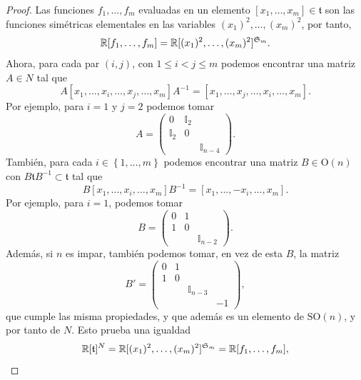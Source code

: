 \documentclass[11pt,a4paper]{amsbook}
\theoremstyle{remark} \newtheorem{rmk}[subsection]{Observación}
\theoremstyle{definition} \newtheorem{defn}[subsection]{Definición}
\theoremstyle{definition} \newtheorem{ex}[subsection]{Ejemplo}
\theoremstyle{definition} \newtheorem{ej}[subsection]{Ejercicio}
\begin{document}
\begin{proof}
Las funciones $f_1,\dots,f_m$ evaluadas en un elemento $[x_1,\dots,x_m]\in \mathfrak{t}$ son las funciones simétricas elementales en las variables $(x_1)^2,\dots,(x_m)^2$, por tanto,
\begin{equation*}
\mathbb R[f_1,\dots,f_m] = \mathbb R[(x_1)^2,\dots,(x_m)^2]^{\mathfrak{S}_m}.
\end{equation*}
Ahora, para cada par $(i,j)$, con $1\leq i<j \leq m$ podemos encontrar una matriz $A\in N$ tal que
\begin{equation*}
A [x_1,\dots,x_i,\dots,x_j,\dots,x_m] A^{-1} = [x_1,\dots,x_j,\dots,x_i,\dots,x_m].
\end{equation*}
Por ejemplo, para $i=1$ y $j=2$ podemos tomar
\begin{equation*}
  A=
  \begin{pmatrix}
    0 & \mathbb{I}_2 \\
    \mathbb{I}_2 & 0 \\
    && \mathbb{I}_{n-4}
\end{pmatrix}.
\end{equation*}
También, para cada $i\in \left\{ 1,\dots,m \right\}$ podemos encontrar una matriz $B \in \mathrm{O}(n)$ con $B\mathfrak{t} B^{-1}\subset \mathfrak{t}$ tal que
\begin{equation*}
B [x_1,\dots,x_i,\dots,x_m] B^{-1} = [x_1,\dots,-x_i,\dots,x_m].
\end{equation*}
Por ejemplo, para $i=1$, podemos tomar
\begin{equation*}
  B =
  \begin{pmatrix}
    0 & 1 \\
    1 & 0 \\
    && \mathbb{I}_{n-2}
\end{pmatrix}.
\end{equation*}
Además, si $n$ es impar, también podemos tomar, en vez de esta $B$, la matriz
\begin{equation*}
  B' =
  \begin{pmatrix}
    0 & 1 \\
    1 & 0 \\
      && \mathbb{I}_{n-3} \\
    &&& -1
\end{pmatrix},
\end{equation*}
que cumple las misma propiedades, y que además es un elemento de $\mathrm{SO}(n)$, y por tanto de $N$. Esto prueba una igualdad
\begin{equation*}
\RR[\mathfrak{t}]^N = \RR[(x_1)^2,\dots,(x_m)^2]^{\mathfrak{S}_m}=\RR[f_1,\dots,f_m],

\end{equation*}
\end{proof}
\end{document}
